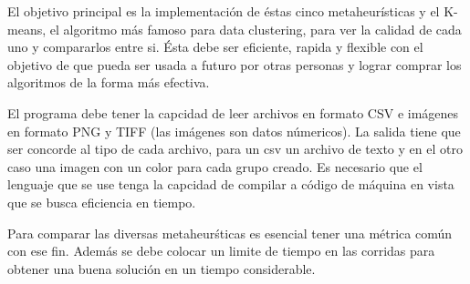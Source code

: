 \vspace{5 mm}

\label{sect:objetivo_general}
\vspace{5 mm}

El objetivo principal es la implementaci\'on de \'estas cinco metaheur\'isticas
y el K-means, el algoritmo m\'as famoso para data clustering, para ver la calidad
de cada uno y compararlos entre si. \'Esta debe ser eficiente, rapida y flexible
con el objetivo de que pueda ser usada a futuro por otras personas y lograr
comprar los algoritmos de la forma m\'as efectiva.


\vspace{5 mm}

\label{sect:objetivos_especificos}
\vspace{5 mm}

El programa debe tener la capcidad de leer archivos en formato CSV e im\'agenes
en formato PNG y TIFF (las im\'agenes son datos n\'umericos). La salida tiene que ser
concorde al tipo de cada archivo, para un csv un archivo de texto y
en el otro caso una imagen con un color para cada grupo creado. Es necesario que
el lenguaje que se use tenga la capcidad de compilar a c\'odigo de m\'aquina
en vista que se busca eficiencia en tiempo.

Para comparar las diversas metaheur\'sticas es esencial tener una m\'etrica com\'un
con ese fin. Adem\'as se debe colocar un limite de tiempo en las corridas para 
obtener una buena soluci\'on en un tiempo considerable.


